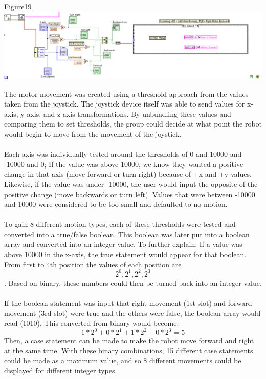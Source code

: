 \documentclass{article}
\begin{document}
\begin{center}{Figure19 \includegraphics[width=\textwidth]{MotorMovement.png}}\end{center}
The motor movement was created using a threshold approach from the values taken from the joystick. The joystick device itself was able to send values for x-axis, y-axis, and z-axis transformations. By unbundling these values and comparing them to set thresholds, the group could decide at what point the robot would begin to move from the movement of the joystick.
\\\\Each axis was individually tested around the thresholds of 0 and 10000 and -10000 and 0; If the value was above 10000, we know they wanted a positive change in that axis (move forward or turn right) because of +x and +y values. Likewise, if the value was under -10000, the user would input the opposite of the positive change (move backwards or turn left). Values that were between -10000 and 10000 were considered to be too small and defaulted to no motion.
\\\\To gain 8 different motion types, each of these thresholds were tested and converted into a true/false boolean. This boolean was later put into a boolean array and converted into an integer value. To further explain: If a value was above 10000 in the x-axis, the true statement would appear for that boolean. From first to 4th position the values of each position are \[2^0 , 2^1, 2^2, 2^3\]. Based on binary, these numbers could then be turned back into an integer value.
\\\\If the boolean statement was input that right movement (1st slot) and forward movement (3rd slot) were true and the others were false, the boolean array would read (1010). This converted from binary would become: 
\[1*2^0 + 0*2^1 + 1*2^2 + 0*2^3 = 5\]
Then, a case statement can be made to make the robot move forward and right at the same time. With these binary combinations, 15 different case statements could be made as a maximum value, and so 8 different movements could be displayed for different integer types.
\end{document}

